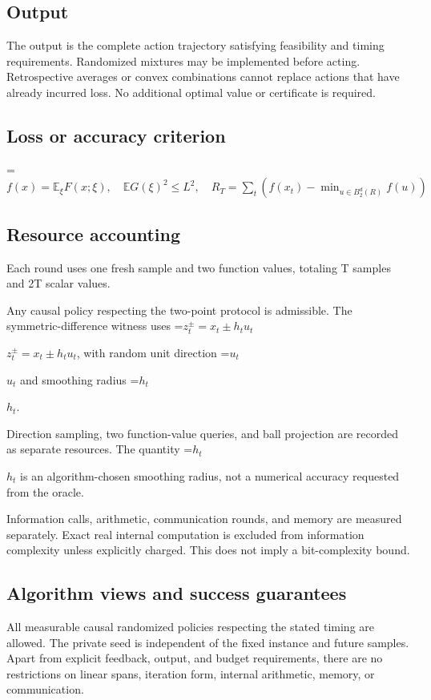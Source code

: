 \documentclass[10pt,a4paper]{article}
\newcommand{\AtlasMath}[1]{\par\begingroup\centering\setbox0=\hbox{$\displaystyle #1$}\ifdim\wd0>1.4\linewidth\typeout{ATLAS WIDE FORMULA: \the\wd0}\fi\ifdim\wd0>\linewidth\resizebox{\linewidth}{!}{\box0}\else\box0\fi\par\endgroup}
\newcommand{\AtlasInlineMath}[1]{\begingroup\setbox0=\hbox{$#1$}\ifdim\wd0>.4\linewidth\endgroup\AtlasMath{#1}\else\endgroup$#1$\fi}
\begin{document}
\subsection{Output}
The output is the complete action trajectory satisfying feasibility and timing requirements. Randomized mixtures may be implemented before acting. Retrospective averages or convex combinations cannot replace actions that have already incurred loss. No additional optimal value or certificate is required.

\subsection{Loss or accuracy criterion}

\AtlasMath{f(x)=\mathbb{E}_\xi F(x;\xi),\quad \mathbb{E} G(\xi)^2\le L^2,\quad R_T=\sum_t\left(f(x_t)-\min_{u\in B_2^d(R)}f(u)\right)}


\subsection{Resource accounting}
Each round uses one fresh sample and two function values, totaling T samples and 2T scalar values.

Any causal policy respecting the two-point protocol is admissible. The symmetric-difference witness uses \AtlasInlineMath{z_t^\pm=x_t\pm h_tu_t}, with random unit direction \AtlasInlineMath{u_t} and smoothing radius \AtlasInlineMath{h_t}.

Direction sampling, two function-value queries, and ball projection are recorded as separate resources. The quantity \AtlasInlineMath{h_t} is an algorithm-chosen smoothing radius, not a numerical accuracy requested from the oracle.

Information calls, arithmetic, communication rounds, and memory are measured separately. Exact real internal computation is excluded from information complexity unless explicitly charged. This does not imply a bit-complexity bound.

\subsection{Algorithm views and success guarantees}
All measurable causal randomized policies respecting the stated timing are allowed. The private seed is independent of the fixed instance and future samples. Apart from explicit feedback, output, and budget requirements, there are no restrictions on linear spans, iteration form, internal arithmetic, memory, or communication.
\end{document}

